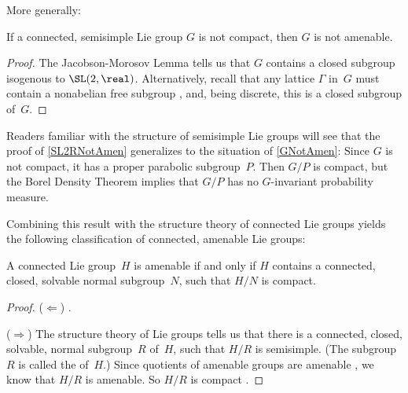 More generally:

\begin{prop} \label{GNotAmen}
If a connected, semisimple Lie group $G$ is not compact, then $G$ is not amenable.
\end{prop}

\begin{proof}
The {Jacobson-Morosov Lemma}  tells us that $G$ contains a closed subgroup isogenous to $\SL(2,\real)$. Alternatively, recall that any lattice $\Gamma$ in~$G$ must contain a nonabelian free subgroup , and, being discrete, this is a closed subgroup of~$G$.
\end{proof}

\begin{rem}
Readers familiar with the structure of semisimple Lie groups will see that the proof of \cref{SL2RNotAmen} generalizes to the situation of \cref{GNotAmen}: Since $G$ is not compact, it has a proper parabolic subgroup~$P$. Then $G/P$ is compact, but the Borel Density Theorem implies that $G/P$ has no $G$-invariant probability measure.
\end{rem}

Combining this result with the structure theory of connected Lie groups yields the following classification of connected, amenable Lie groups:

\begin{prop} \label{ConnAmen}
A connected Lie group~$H$ is amenable if and only if $H$ contains a connected, closed, solvable normal subgroup~$N$, such that $H/N$ is compact.
\end{prop}

\begin{proof}
($\Leftarrow$) .

($\Rightarrow$) The structure theory of Lie groups tells us that there is a connected, closed, solvable, normal subgroup~$R$ of~$H$, such that $H/R$ is semisimple. (The subgroup~$R$ is called the  of~$H$.) Since quotients of amenable groups are amenable , we know that $H/R$ is amenable. So $H/R$ is compact .
\end{proof}

